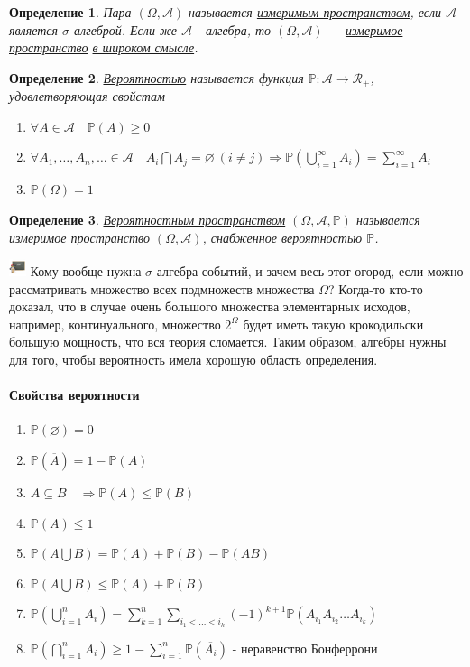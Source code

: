 \documentclass[12pt]{article}
\newtheorem{Def}{Определение}
\newenvironment{Wtf}{\includegraphics[height=5mm]{ping}}{}
\numberwithin{Th}{section}
\numberwithin{Def}{section}
\numberwithin{Lem}{section}
\numberwithin{St}{section}
\numberwithin{equation}{section}
\newcommand\Pro{\mathbb{P}} %
\newcommand\Ev{\mathscr{A}} %
\begin{document}
\begin{Def}
Пара $(\Omega, \Ev)$ называется \underline{измеримым пространством}, если $\Ev$ является $\sigma$-алгеброй. Если же $\Ev$ - алгебра, то  $(\Omega, \Ev)$ --- \underline{измеримое пространство} \underline{ в широком смысле}.
\end{Def}

\begin{Def}
\underline{Вероятностью} называется функция $\Pro \colon \Ev\rightarrow \mathscr{R}_+$, удовлетворяющая свойстам
\begin{enumerate}
	\item $\forall A \in \Ev \quad \Pro (A) \ge 0$
	\item $\forall A_1, \dots, A_n, \ldots \in \Ev \quad A_i \bigcap A_j  = \varnothing\  (i \not= j)  \Rightarrow \Pro (\bigcup\limits_{i=1}^{\infty} A_i) = \sum\limits_{i = 1}^{\infty} A_i$
	\item $\Pro (\Omega) = 1$
\end{enumerate}
\end{Def}

\begin{Def}
\underline{Вероятностным пространством} $(\Omega, \Ev, \Pro)$ называется измеримое пространство $(\Omega, \Ev)$, снабженное вероятностью $\Pro$.
\end{Def}
\begin{Wtf}
Кому вообще нужна $\sigma$-алгебра событий, и зачем весь этот огород, если можно рассматривать множество всех подмножеств множества $\Omega$? Когда-то кто-то доказал, что в случае очень большого множества элементарных исходов, например, континуального, множество $2^{\Omega}$ будет иметь такую крокодильски большую мощность, что вся теория сломается. Таким образом, алгебры нужны для того, чтобы вероятность имела хорошую область определения.
\end{Wtf}

\paragraph{Свойства вероятности}
\begin{enumerate}
	\item $\Pro (\varnothing) = 0$ 
	\item $\Pro (\overline{A}) = 1 - \Pro (A)$
	\item $A \subseteq B \quad \Rightarrow \Pro (A) \le \Pro (B)$
	\item $\Pro (A) \le 1$
	\item $\Pro (A \bigcup B) = \Pro (A) + \Pro (B) - \Pro (AB)$ 
	\item $\Pro (A \bigcup B) \le \Pro (A) + \Pro (B)$ 
	\item $\Pro (\bigcup\limits_{i=1}^{n} A_i) = \sum\limits_{k=1}^{n} \sum\limits_{i_1<\dots <i_k} (-1)^{k+1} \Pro(A_{i_1}A_{i_2}\ldots A_{i_k})$
	\item $\Pro (\bigcap\limits_{i=1}^{n} A_i) \ge 1 - \sum\limits_{i=1}^{n} \Pro (\overline{A_i})$ - неравенство Бонферрони
\end{enumerate}
\end{document}
